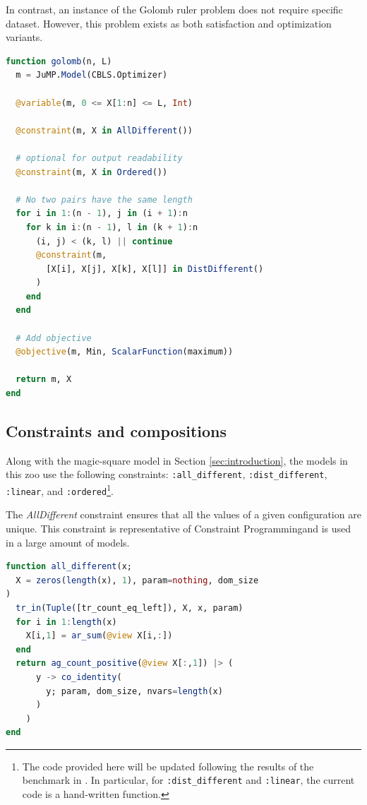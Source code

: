 \documentclass{juliacon}
\begin{document}
In contrast, an instance of the Golomb ruler problem does not require specific dataset. However, this problem exists as both satisfaction and optimization variants.

\begin{lstlisting}[language = Julia]
function golomb(n, L)
  m = JuMP.Model(CBLS.Optimizer)

  @variable(m, 0 <= X[1:n] <= L, Int)

  @constraint(m, X in AllDifferent())

  # optional for output readability
  @constraint(m, X in Ordered())

  # No two pairs have the same length
  for i in 1:(n - 1), j in (i + 1):n
    for k in i:(n - 1), l in (k + 1):n
      (i, j) < (k, l) || continue
      @constraint(m,
        [X[i], X[j], X[k], X[l]] in DistDifferent()
      )
    end
  end

  # Add objective
  @objective(m, Min, ScalarFunction(maximum))

  return m, X
end
\end{lstlisting}

\subsection{Constraints and compositions}
\label{subsec:constraints}

Along with the magic-square model in Section \ref{sec:introduction}, the models in this zoo use the following constraints: \texttt{:all\_different}, \texttt{:dist\_different}, \texttt{:linear}, and \texttt{:ordered}\footnote{The code provided here will be updated following the results of the benchmark in \cite{baffier2022interpretable}. In particular, for \texttt{:dist\_different} and \texttt{:linear}, the current code is a hand-written function.}.\newline

The \emph{AllDifferent} constraint ensures that all the values of a given configuration are unique. This constraint is representative of Constraint Programmingand is used in a large amount of models.

\begin{lstlisting}[language = Julia]
function all_different(x;
  X = zeros(length(x), 1), param=nothing, dom_size
)
  tr_in(Tuple([tr_count_eq_left]), X, x, param)
  for i in 1:length(x)
    X[i,1] = ar_sum(@view X[i,:])
  end
  return ag_count_positive(@view X[:,1]) |> (
      y -> co_identity(
        y; param, dom_size, nvars=length(x)
      )
    )
end
\end{lstlisting}
\end{document}

